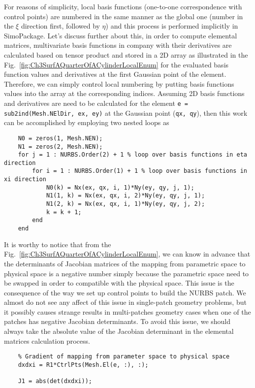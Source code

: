 For reasons of simplicity, local basis functions (one-to-one correspondence with control points) are numbered in the same manner as the global one (number in the $\xi$ direction first, followed by $\eta$) and this process is performed implicitly in SimoPackage. Let's discuss further about this, in order to compute elemental matrices, multivariate basis functions in company with their derivatives are calculated based on tensor product and stored in a 2D array as illustrated in the Fig.~\ref{fig:Ch3SurfAQuarterOfACylinderLocalEnum} for the evaluated basis function values and derivatives at the first Gaussian point of the element. Therefore, we can simply control local numbering by putting basis functions values into the array at the corresponding indices. Assuming 2D basis functions and derivatives are need to be calculated for the element \lstinline{e = sub2ind(Mesh.NElDir, ex, ey)} at the Gaussian point (\lstinline{qx, qy}), then this work can be accomplished by employing two nested loops as
\begin{lstlisting}
    N0 = zeros(1, Mesh.NEN);
    N1 = zeros(2, Mesh.NEN);
    for j = 1 : NURBS.Order(2) + 1 % loop over basis functions in eta direction
        for i = 1 : NURBS.Order(1) + 1 % loop over basis functions in xi direction
            N0(k) = Nx(ex, qx, i, 1)*Ny(ey, qy, j, 1);
            N1(1, k) = Nx(ex, qx, i, 2)*Ny(ey, qy, j, 1);
            N1(2, k) = Nx(ex, qx, i, 1)*Ny(ey, qy, j, 2);
            k = k + 1;
        end
    end
\end{lstlisting}
It is worthy to notice that from the Fig.~\ref{fig:Ch3SurfAQuarterOfACylinderLocalEnum}, we can know in advance that the determinants of Jacobian matrices of the mapping from parametric space to physical space is a negative number simply because the parametric space need to be swapped in order to compatible with the physical space. This issue is the consequence of the way we set up control points to build the NURBS patch. We almost do not see any affect of this issue in single-patch geometry problems, but it possibly causes strange results in multi-patches geometry cases when one of the patches has negative Jacobian determinants. To avoid this issue, we should always take the absolute value of the Jacobian determinant in the elemental matrices calculation process.
\begin{lstlisting}
    % Gradient of mapping from parameter space to physical space
    dxdxi = R1*CtrlPts(Mesh.El(e, :), :);

    J1 = abs(det(dxdxi));
\end{lstlisting}
